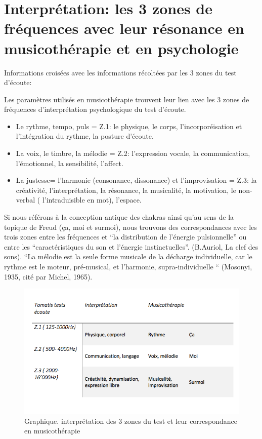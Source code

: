   


\section{Interprétation: les 3 zones de fréquences avec leur résonance en musicothérapie et en
  psychologie}


	Informations croisées avec les informations récoltées par les 3 
          zones du test d'écoute:
          
Les paramètres utilisés en musicothérapie trouvent leur lien avec les
3 zones de fréquences d'interprétation psychologique du test d'écoute.
\begin{itemize}
 \item Le rythme, tempo, puls  =  Z.1: le physique, le corps, l'incorporéisation et
l'intégration du rythme,
la posture d'écoute.

\item La voix, le timbre, la mélodie =  Z.2:  l'expression vocale, la communication,
l'émotionnel, la sensibilité, l'affect.

\item La justesse= l'harmonie (consonance, dissonance) et l'improvisation = Z.3:  la créativité, l'interprétation, la
résonance, la musicalité, la motivation, le non-verbal (
l'intraduisible en mot), l'espace.
\end{itemize}

Si nous référons à la conception antique des chakras ainsi qu'au sens de la
topique de Freud (ça, moi et surmoi), nous trouvons des correspondances
avec les trois zones entre les
fréquences et ``la distribution de l'énergie pulsionnelle'' ou entre
les 
``caractéristiques du son et l'énergie instinctuelles''. (B.Auriol, La
clef des sons).
``La mélodie est la seule forme musicale de la décharge individuelle, car le rythme est le moteur, pré-musical, et l'harmonie, supra-individuelle `` (Mosonyi, 1935, cité par Michel, 1965).

 

\begin{figure}
	\centering
	\includegraphics[width=0.7\linewidth]{images/testinterpmusico}
	\caption[ L'interprétation des 3 zones et leur correspondance
        en musicothérapie]{Graphique. interprétation des 3 zones du
          test et leur correspondance en musicothérapie}
       
	\label{graphiquecolonnetestmusico}
      \end{figure}











